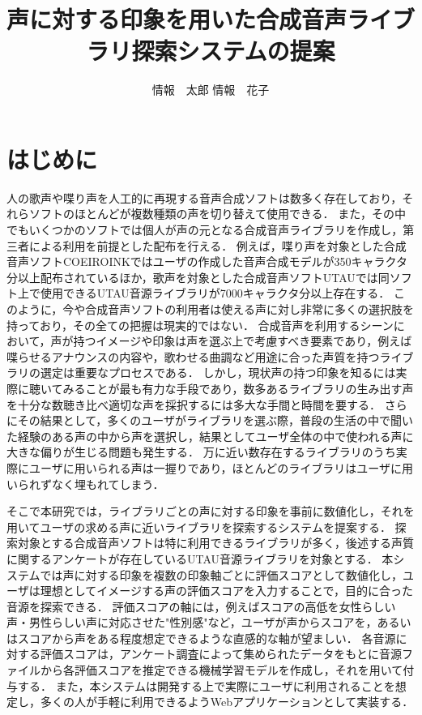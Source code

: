 \documentclass[a4j,8pt,twocolumn]{extarticle}
\title{声に対する印象を用いた合成音声ライブラリ探索システムの提案}
\author{情報　太郎 \qquad 情報　花子}
\affiliation{情報大学情報学部}
\begin{document}
\maketitle
\thispagestyle{empty}	%

\section{はじめに}

人の歌声や喋り声を人工的に再現する音声合成ソフトは数多く存在しており，それらソフトのほとんどが複数種類の声を切り替えて使用できる．
また，その中でもいくつかのソフトでは個人が声の元となる合成音声ライブラリを作成し，第三者による利用を前提とした配布を行える．
例えば，喋り声を対象とした合成音声ソフトCOEIROINKではユーザの作成した音声合成モデルが350キャラクタ分以上配布されているほか\cite{mycoeiroink}，歌声を対象とした合成音声ソフトUTAUでは同ソフト上で使用できるUTAU音源ライブラリが7000キャラクタ分以上存在する\cite{vdbutau}．
このように，今や合成音声ソフトの利用者は使える声に対し非常に多くの選択肢を持っており，その全ての把握は現実的ではない．
合成音声を利用するシーンにおいて，声が持つイメージや印象は声を選ぶ上で考慮すべき要素であり，例えば喋らせるアナウンスの内容や，歌わせる曲調など用途に合った声質を持つライブラリの選定は重要なプロセスである．
しかし，現状声の持つ印象を知るには実際に聴いてみることが最も有力な手段であり，数多あるライブラリの生み出す声を十分な数聴き比べ適切な声を採択するには多大な手間と時間を要する．
さらにその結果として，多くのユーザがライブラリを選ぶ際，普段の生活の中で聞いた経験のある声の中から声を選択し，結果としてユーザ全体の中で使われる声に大きな偏りが生じる問題も発生する．
万に近い数存在するライブラリのうち実際にユーザに用いられる声は一握りであり，ほとんどのライブラリはユーザに用いられずなく埋もれてしまう．

そこで本研究では，ライブラリごとの声に対する印象を事前に数値化し，それを用いてユーザの求める声に近いライブラリを探索するシステムを提案する．
探索対象とする合成音声ソフトは特に利用できるライブラリが多く，後述する声質に関するアンケートが存在しているUTAU音源ライブラリを対象とする．
本システムでは声に対する印象を複数の印象軸ごとに評価スコアとして数値化し，ユーザは理想としてイメージする声の評価スコアを入力することで，目的に合った音源を探索できる．
評価スコアの軸には，例えばスコアの高低を女性らしい声・男性らしい声に対応させた"性別感"など，ユーザが声からスコアを，あるいはスコアから声をある程度想定できるような直感的な軸が望ましい．
各音源に対する評価スコアは，アンケート調査によって集められたデータをもとに音源ファイルから各評価スコアを推定できる機械学習モデルを作成し，それを用いて付与する．
また，本システムは開発する上で実際にユーザに利用されることを想定し，多くの人が手軽に利用できるようWebアプリケーションとして実装する．
\end{document}
